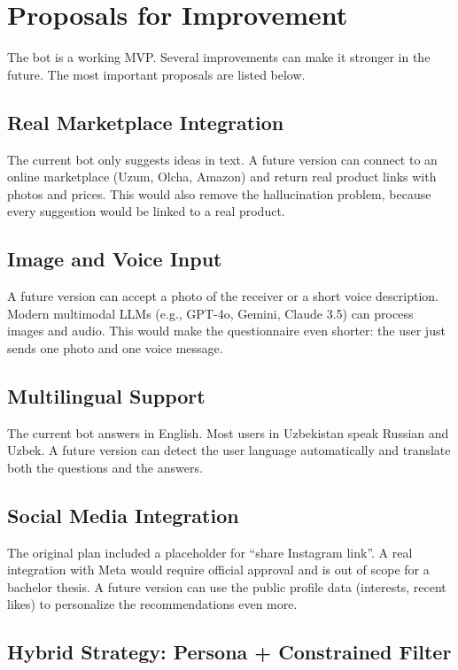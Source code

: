 \section{Proposals for Improvement}
\label{sec:proposals}

The bot is a working MVP. Several improvements can make it stronger in the future. The most important proposals are listed below.

\subsection{Real Marketplace Integration}

The current bot only suggests ideas in text. A future version can connect to an online marketplace (Uzum, Olcha, Amazon) and return real product links with photos and prices. This would also remove the hallucination problem, because every suggestion would be linked to a real product.

\subsection{Image and Voice Input}

A future version can accept a photo of the receiver or a short voice description. Modern multimodal LLMs (e.g., GPT-4o, Gemini, Claude 3.5) can process images and audio. This would make the questionnaire even shorter: the user just sends one photo and one voice message.

\subsection{Multilingual Support}

The current bot answers in English. Most users in Uzbekistan speak Russian and Uzbek. A future version can detect the user language automatically and translate both the questions and the answers.

\subsection{Social Media Integration}

The original plan included a placeholder for ``share Instagram link''. A real integration with Meta would require official approval and is out of scope for a bachelor thesis. A future version can use the public profile data (interests, recent likes) to personalize the recommendations even more.

\subsection{Hybrid Strategy: Persona + Constrained Filter}

